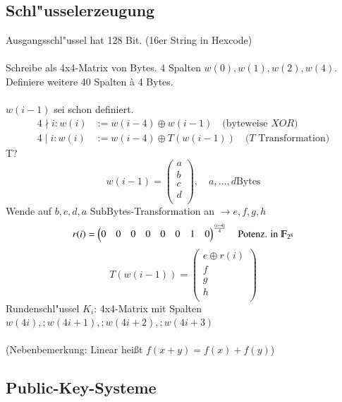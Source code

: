 \subsection{Schl"usselerzeugung}
Ausgangsschl"ussel hat 128 Bit. (16er String in Hexcode)\\
\\
Schreibe als 4x4-Matrix von Bytes. 4 Spalten $w(0), w(1), w(2), w(4)$. Definiere weitere 40 Spalten \`a 4 Bytes.\\
\\
$w(i-1)$ sei schon definiert.
\begin{align*}
	4 \nmid i : w(i) &:= w(i-4) \oplus w(i-1)\quad \text{(byteweise $XOR$)}\\
	4 \mid i : w(i) &:= w(i-4) \oplus T(w(i-1))\quad \text{($T$ Transformation)}
\end{align*}
T?\\
\[
	w(i-1) =
	\begin{pmatrix}
		a\\
		b\\
		c\\
		d\\
	\end{pmatrix} ,\quad a,\ldots,d \text{Bytes}
\]
Wende auf $b, c, d, a$ SubBytes-Transformation an $\rightarrow e, f, g, h$\\ 
\[
	r(i) =
	\begin{pmatrix}
		0 & 0 & 0 & 0 & 0 & 0 & 1 & 0\\
	\end{pmatrix}^{\frac{(i-4)}{4}}\quad \text{Potenz. in }\F_{2^8}
\]	
\[
	T(w(i-1)) = 
	\begin{pmatrix}
		e \oplus r(i)\\
		f\\
		g\\
		h\\
	\end{pmatrix}
\]	
Rundenschl"ussel $K_i$: 4x4-Matrix mit Spalten $w(4i),; w(4i+1),; w(4i+2),; w(4i+3)$\\
\\
(Nebenbemerkung: Linear hei\ss t $f(x+y) = f(x) + f(y)$)


\subsection{Public-Key-Systeme}

